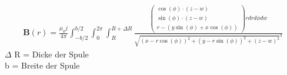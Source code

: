 \documentclass[12pt,a4paper]{article}
\begin{document}
\begin{align*}
\textbf{B}(r) = \frac{\mu_0j}{4\pi}\int_{-b/2}^{b/2}\int_{0}^{2\pi}\int_{R}^{R+\Delta R} \frac{\begin{pmatrix}
\cos(\phi)\cdot (z-w) \\
\sin(\phi)\cdot (z-w) \\
r-(y\sin(\phi)+x\cos(\phi))
\end{pmatrix}r dr d\phi dw}{\sqrt{(x-r\cos(\phi))^2+(y-r\sin(\phi))^2+(z-w)^2}^3}
\end{align*}
$\Delta$ R = Dicke der Spule \\
b = Breite der Spule
\end{document}
